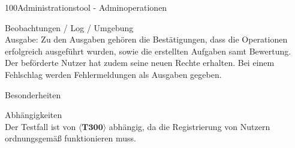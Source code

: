 \begin{testcase}{100}{Administrationstool - Adminoperationen}
\item[Beobachtungen / Log / Umgebung]~\\
Ausgabe:
Zu den Ausgaben gehören die Bestätigungen, dass die Operationen erfolgreich ausgeführt wurden, sowie die erstellten Aufgaben samt Bewertung. Der beförderte Nutzer hat zudem seine neuen Rechte erhalten. 
Bei einem Fehlschlag werden Fehlermeldungen als Ausgaben gegeben.

\item[Besonderheiten]~\\

\item[Abhängigkeiten]~\\
Der Testfall ist von $\langle\textbf{T300}\rangle$ abhängig, da die Registrierung von Nutzern ordnungsgemäß funktionieren muss.

\end{testcase}

